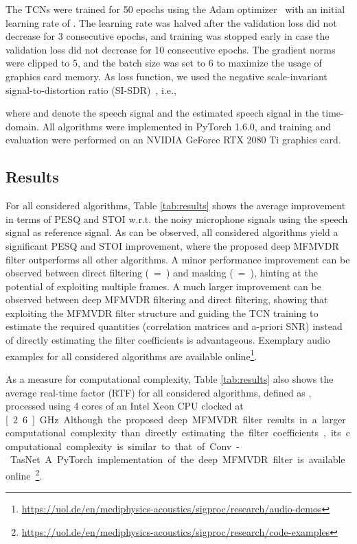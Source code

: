 \documentclass{article}
\begin{document}
The TCNs were trained for 50 epochs using the Adam optimizer~\cite{kingma_adam:_2014} with an initial learning rate of .
The learning rate was halved after the validation loss did not decrease for 3 consecutive epochs, and training was stopped early in case the validation loss did not decrease for 10 consecutive epochs.
The gradient norms were clipped to 5, and the batch size was set to 6 to maximize the usage of graphics card memory.
As loss function, we used the negative scale-invariant signal-to-distortion ratio (SI-SDR)~\cite{roux_sdr_2019}, i.e.,

where  and  denote the speech signal and the estimated speech signal in the time-domain.
All algorithms were implemented in PyTorch 1.6.0, and training and evaluation were performed on an NVIDIA GeForce\textsuperscript{\textregistered} RTX 2080 Ti graphics card.

\subsection{Results}
\label{sec:results}
For all considered algorithms, Table \ref{tab:results} shows the average improvement in terms of PESQ and STOI w.r.t. the noisy microphone signals using the speech signal as reference signal.
As can be observed, all considered algorithms yield a significant PESQ and STOI improvement, where the proposed deep MFMVDR filter outperforms all other algorithms.
A minor performance improvement can be observed between direct filtering (~=~) and masking (~=~), hinting at the potential of exploiting multiple frames.
A much larger improvement can be observed between deep MFMVDR filtering and direct filtering, showing that exploiting the MFMVDR filter structure and guiding the TCN training to estimate the required quantities (correlation matrices and a-priori SNR) instead of directly estimating the filter coefficients is advantageous.
Exemplary audio examples for all considered algorithms are available online\footnote{\scriptsize\href{https://uol.de/en/mediphysics-acoustics/sigproc/research/audio-demos}{https://uol.de/en/mediphysics-acoustics/sigproc/research/audio-demos}}.

As a measure for computational complexity, Table \ref{tab:results} also shows the average real-time factor (RTF) for all considered algorithms, defined as , processed using 4 cores of an Intel\textsuperscript{\textregistered} Xeon\textsuperscript{\textregistered} CPU clocked at \unit[2.6]{GHz}.
Although the proposed deep MFMVDR filter results in a larger computational complexity than directly estimating the filter coefficients, its computational complexity is similar to that of Conv-TasNet.
A PyTorch implementation of the deep MFMVDR filter is available online\footnote{\scriptsize\href{https://uol.de/en/mediphysics-acoustics/sigproc/research/code-examples}{https://uol.de/en/mediphysics-acoustics/sigproc/research/code-examples}}.
\end{document}
